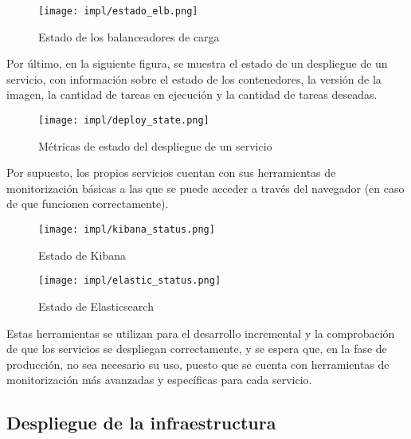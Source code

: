\begin{figure}[H]
	\centering
	\texttt{[image: impl/estado\_elb.png]}
	\caption{Estado de los balanceadores de carga}
	\label{fig:estado_elb}
\end{figure}

Por último, en la siguiente figura, se muestra el estado de un despliegue de un
servicio, con información sobre el estado de los contenedores, la versión de la
imagen, la cantidad de tareas en ejecución y la cantidad de tareas deseadas.

\begin{figure}[H]
	\centering
	\texttt{[image: impl/deploy\_state.png]}
	\caption{Métricas de estado del despliegue de un servicio}
	\label{fig:deploy_state}
\end{figure}

Por supuesto, los propios servicios cuentan con sus herramientas de
monitorización básicas a las que se puede acceder a través del navegador (en
caso de que funcionen correctamente).

\begin{figure}[H]
	\centering
	\texttt{[image: impl/kibana\_status.png]}
	\caption{Estado de Kibana}
	\label{fig:kibana_status}
\end{figure}

\begin{figure}[H]
	\centering
	\texttt{[image: impl/elastic\_status.png]}
	\caption{Estado de Elasticsearch}
	\label{fig:elastic_status}
\end{figure}

Estas herramientas se utilizan para el desarrollo incremental y la comprobación
de que los servicios se despliegan correctamente, y se espera que, en la fase de
producción, no sea necesario su uso, puesto que se cuenta con herramientas de
monitorización más avanzadas y específicas para cada servicio.

\newpage{}
\subsection{Despliegue de la infraestructura}\label{subsec:impl_cloud_despliegue}

